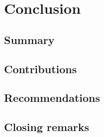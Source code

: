 \chapter{Conclusion}
\label{chap:conclusion}

\section{Summary}
\label{sec:conc-summary}

\section{Contributions}
\label{sec:conc-contributions}

\section{Recommendations}
\label{sec:conc-recommendations}

\section{Closing remarks}
\label{sec:conc-closing}
